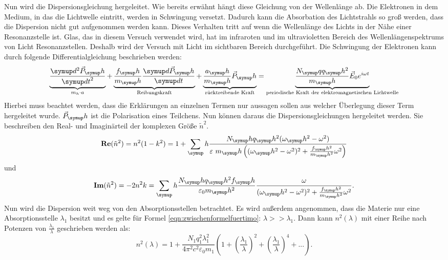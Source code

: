 Nun wird die Dispersionsgleichung hergeleitet. Wie bereits erwähnt hängt diese Gleichung
von der Wellenlänge ab. Die Elektronen in dem Medium, in das die Lichtwelle eintritt,
werden in Schwingung versetzt. Dadurch kann die Absorbation des Lichtstrahls so
groß werden, dass die Dispersion nicht gut aufgenommen werden kann. Dieses Verhalten tritt
auf wenn die Wellenlänge des Lichts in der Nähe einer Resonanzstelle ist.
Glas, das in diesem Versuch verwendet wird, hat im infraroten und im ultravioletten Bereich des
Wellenlängenspektrums von Licht Resonanzstellen. Deshalb wird der Versuch mit Licht im sichtbaren
Bereich durchgeführt.
Die Schwingung der Elektronen kann durch folgende Differentialgleichung beschrieben werden:
\begin{equation}
  \underbrace{\frac{\g{d}^2 \vec{P}_\g{h}}{\g{d t}^2}}_{m_h \cdot a}
   + \underbrace{\frac{f_\g{h}}{m_\g{h}} \frac{\g{d}\vec{P}_\g{h}}{\g{d t}}}_{\text{Reibungskraft}}
   + \underbrace{\frac{a_\g{h}}{m_\g{h}}\vec{P}_\g{h}}_{\text{rücktreibende Kraft}}
   = \underbrace{\frac{N_\g{q} q_\g{h}^2}{m_\g{h}} \vec{E}_0 e^{i \omega t}}_{\text{periodische Kraft der elektromagnetischen Lichtwelle}}
   \label{eqn:DGL}
\end{equation}
Hierbei muss beachtet werden, dass die Erklärungen an einzelnen Termen nur aussagen sollen aus welcher Überlegung
dieser Term hergeleitet wurde. $\vec{P}_\g{h}$ ist die Polarisation eines Teilchens.
Nun können daraus die Dispersionsgleichungen hergeleitet werden. Sie beschreiben
den Real- und Imaginärteil der komplexen Größe $\tilde{n}^2$.
\begin{equation}
  \textbf{Re}(\tilde{n}^2) = n^2(1- k^2)
  = 1 + \sum_\g{h} \frac{N_\g{h} q_\g{h}^2 (\omega_\g{h}^2-\omega^2)}{\varepsilon~m_\g{h} \left( (\omega_\g{h}^2 - \omega^2)^2 + \frac{f_\g{h}^2}{m_\g{h}^2}\omega^2 \right)}
\end{equation}
und
\begin{equation}
   \textbf{Im}(\tilde{n}^2) = -2 n^2 k
   = \sum_\g{h} \frac{N_\g{h} q_\g{h}^2 f_\g{h}}{\varepsilon_0 m_\g{h}^2} \frac{\omega}{(\omega_\g{h}^2-\omega^2)^2 + \frac{f_\g{h}^2}{m_\g{h}^2} \omega^2 }.
\end{equation}
Nun wird die Dispersion weit weg von den Absorptionsstellen betrachtet. Es wird
außerdem angenommen, dass die Materie nur eine Absorptionsstelle $\lambda_1$ besitzt und
es gelte für Formel \eqref{eqn:zwischenformelfuertimo}: $\lambda >> \lambda_1$.
Dann kann $n^2(\lambda)$ mit einer Reihe nach Potenzen von $\frac{\lambda_1}{\lambda}$
geschrieben werden als:
\begin{equation}
  n^2(\lambda) = 1 + \frac{N_1 q_1^2 \lambda_1^2}{4 \pi^2 c^2 \varepsilon_0 m_1}
  \left( 1 + \left(\frac{\lambda_1}{\lambda}\right)^2 + \left(\frac{\lambda_1}{\lambda}\right)^4 + ...\right).
  \label{eqn:zwischenformelfuertimo}
\end{equation}

